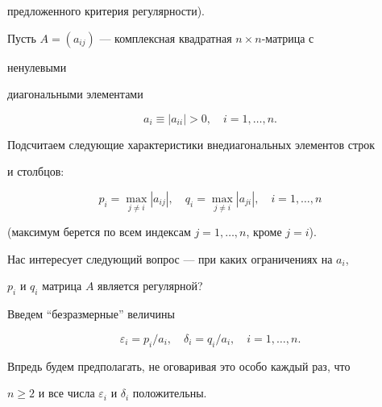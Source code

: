 предложенного критерия регулярности). 


 


Пусть $A=(a_{ij})$ --- комплексная квадратная $n\times n$-матрица с 


ненулевыми  


диагональными элементами 


\begin{equation} 


a_i\equiv|a_{ii}|>0,\quad i=1,\dotsc,n. 


\end{equation} 


Подсчитаем следующие характеристики внедиагональных элементов строк 


и столбцов:


\begin{equation} 


p_i=\max_{j\ne i}|a_{ij}|,\quad 


q_i=\max_{j\ne i}|a_{ji}|,\quad i=1,\dotsc,n 


\end{equation} 


(максимум берется по всем индексам $j=1,\dotsc,n$, кроме $j=i$).


Нас интересует следующий вопрос --- при каких ограничениях на $a_i$, 


$p_i$ и $q_i$ матрица $A$ является регулярной? 


Введем ``безразмерные'' величины 


\begin{equation} 


\varepsilon_i=p_i/a_i,\quad \delta_i=q_i/a_i,\quad 


i=1,\dotsc,n. 


\end{equation} 


Впредь будем предполагать, не оговаривая это особо каждый раз, что 


$n\ge 2$ и все числа $\varepsilon_i$ и $\delta_i$ положительны. 


 


